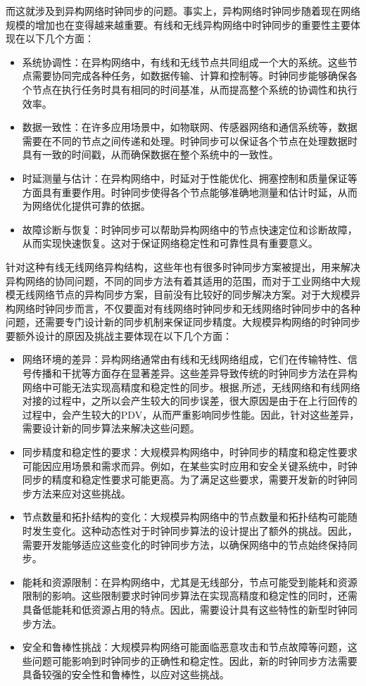 \documentclass[UTF8,a4paper,12pt]{ctexart}
\numberwithin{equation}{section}
\begin{document}
而这就涉及到异构网络时钟同步的问题。事实上，异构网络时钟同步随着现在网络规模的增加也在变得越来越重要。有线和无线异构网络中时钟同步的重要性主要体现在以下几个方面：
\begin{itemize}
	\item 系统协调性：在异构网络中，有线和无线节点共同组成一个大的系统。这些节点需要协同完成各种任务，如数据传输、计算和控制等。时钟同步能够确保各个节点在执行任务时具有相同的时间基准，从而提高整个系统的协调性和执行效率。
	\item 数据一致性：在许多应用场景中，如物联网、传感器网络和通信系统等，数据需要在不同的节点之间传递和处理。时钟同步可以保证各个节点在处理数据时具有一致的时间戳，从而确保数据在整个系统中的一致性。
	\item 时延测量与估计：在异构网络中，时延对于性能优化、拥塞控制和质量保证等方面具有重要作用。时钟同步使得各个节点能够准确地测量和估计时延，从而为网络优化提供可靠的依据。
	\item 故障诊断与恢复：时钟同步可以帮助异构网络中的节点快速定位和诊断故障，从而实现快速恢复。这对于保证网络稳定性和可靠性具有重要意义。
\end{itemize}

针对这种有线无线网络异构结构，这些年也有很多时钟同步方案被提出，用来解决异构网络的协同问题，不同的同步方法有着其适用的范围，而对于工业网络中大规模无线网络节点的异构同步方案，目前没有比较好的同步解决方案。对于大规模异构网络时钟同步而言，不仅要面对有线网络时钟同步和无线网络时钟同步中的各种问题，还需要专门设计新的同步机制来保证同步精度。大规模异构网络的时钟同步要额外设计的原因及挑战主要体现在以下几个方面：
\begin{itemize}
	\item 网络环境的差异：异构网络通常由有线和无线网络组成，它们在传输特性、信号传播和干扰等方面存在显著差异。这些差异导致传统的时钟同步方法在异构网络中可能无法实现高精度和稳定性的同步。根据\cite{chaloupka2014clock},\cite{johannessen2004time}所述，无线网络和有线网络对接的过程中，之所以会产生较大的同步误差，很大原因是由于在上行回传的过程中，会产生较大的PDV，从而严重影响同步性能。因此，针对这些差异，需要设计新的同步算法来解决这些问题。
	\item 同步精度和稳定性的要求：大规模异构网络中，时钟同步的精度和稳定性要求可能因应用场景和需求而异。例如，在某些实时应用和安全关键系统中，时钟同步的精度和稳定性要求可能更高。为了满足这些要求，需要开发新的时钟同步方法来应对这些挑战。
	\item 节点数量和拓扑结构的变化：大规模异构网络中的节点数量和拓扑结构可能随时发生变化。这种动态性对于时钟同步算法的设计提出了额外的挑战。因此，需要开发能够适应这些变化的时钟同步方法，以确保网络中的节点始终保持同步。
	\item 能耗和资源限制：在异构网络中，尤其是无线部分，节点可能受到能耗和资源限制的影响。这些限制要求时钟同步算法在实现高精度和稳定性的同时，还需具备低能耗和低资源占用的特点。因此，需要设计具有这些特性的新型时钟同步方法。
	\item 安全和鲁棒性挑战：大规模异构网络可能面临恶意攻击和节点故障等问题，这些问题可能影响到时钟同步的正确性和稳定性。因此，新的时钟同步方法需要具备较强的安全性和鲁棒性，以应对这些挑战。
\end{itemize}
\end{document}
